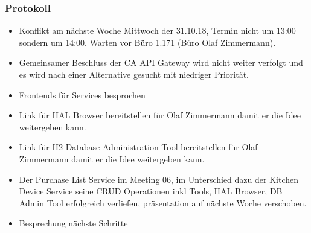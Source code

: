 \documentclass{article}
\begin{document}
\subsubsection{Protokoll}
\begin{itemize}
    \item Konflikt am nächste Woche Mittwoch der 31.10.18, Termin nicht um 13:00 sondern um 14:00. Warten vor Büro 1.171 (Büro Olaf Zimmermann).
    \item Gemeinsamer Beschluss der CA API Gateway wird nicht weiter verfolgt und es wird nach einer Alternative gesucht mit niedriger Priorität.
    \item Frontends für Services besprochen
    \item Link für HAL Browser bereitstellen für Olaf Zimmermann damit er die Idee weitergeben kann.
    \item Link für H2 Database Administration Tool bereitstellen für Olaf Zimmermann damit er die Idee weitergeben kann.
    \item Der Purchase List Service im Meeting 06, im Unterschied dazu der Kitchen Device Service seine CRUD Operationen inkl Tools, HAL Browser, DB Admin Tool erfolgreich verliefen, präsentation auf nächste Woche verschoben.
    \item Besprechung nächste Schritte
\end{itemize}
\end{document}
